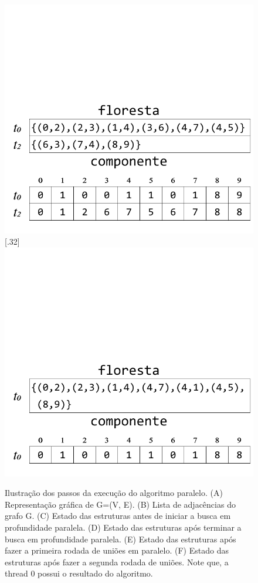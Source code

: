 \documentclass[12pt]{article}
\begin{document}
\begin{figure}[htp!]
{		\includegraphics[width=\linewidth]{figE.pdf}
	}
	\subcaptionbox{}[.32\textwidth]
	{
		\includegraphics[width=\linewidth]{figF.pdf}
	}
	\caption{Ilustração dos passos da execução do algoritmo paralelo. (A) Representação gráfica de G=(V, E). (B) Lista de adjacências do grafo G. (C) Estado das estruturas antes de iniciar a busca em profundidade paralela. (D) Estado das estruturas após terminar a busca em profundidade paralela. (E) Estado das estruturas após fazer a primeira rodada de uniões em paralelo. (F) Estado das estruturas após fazer a segunda rodada de uniões. Note que, a thread 0 possui o resultado do algoritmo.}
\end{figure}
\end{document}
